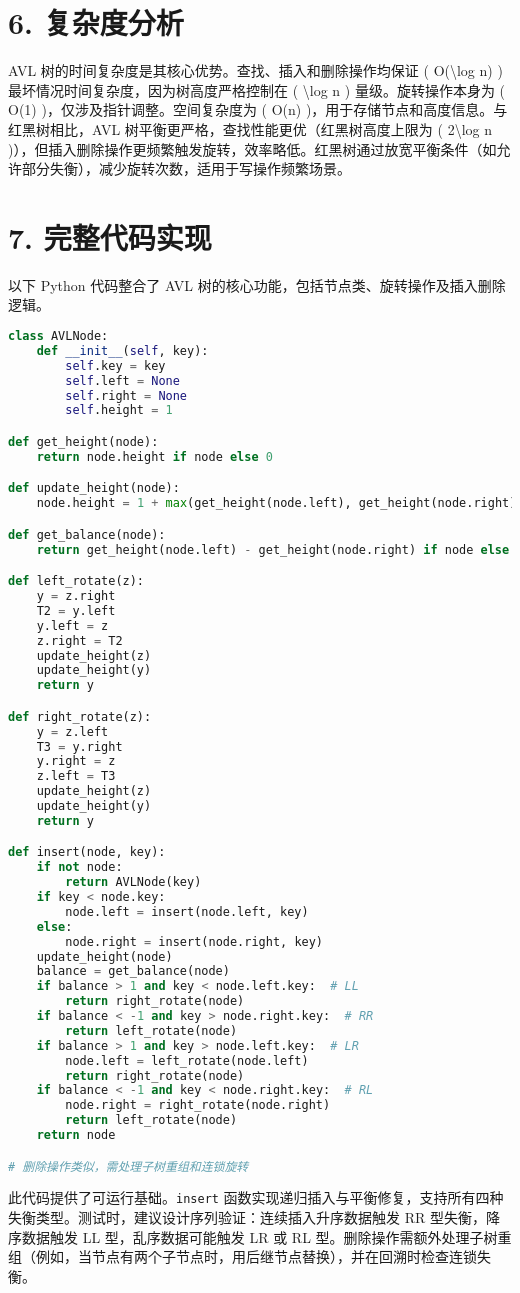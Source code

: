 \chapter{6. 复杂度分析}
AVL 树的时间复杂度是其核心优势。查找、插入和删除操作均保证 ( O(\textbackslash{}log n) ) 最坏情况时间复杂度，因为树高度严格控制在 ( \textbackslash{}log n ) 量级。旋转操作本身为 ( O(1) )，仅涉及指针调整。空间复杂度为 ( O(n) )，用于存储节点和高度信息。与红黑树相比，AVL 树平衡更严格，查找性能更优（红黑树高度上限为 ( 2\textbackslash{}log n )），但插入删除操作更频繁触发旋转，效率略低。红黑树通过放宽平衡条件（如允许部分失衡），减少旋转次数，适用于写操作频繁场景。\par
\chapter{7. 完整代码实现}
以下 Python 代码整合了 AVL 树的核心功能，包括节点类、旋转操作及插入删除逻辑。\par
\begin{lstlisting}[language=python]
class AVLNode:
    def __init__(self, key):
        self.key = key
        self.left = None
        self.right = None
        self.height = 1

def get_height(node):
    return node.height if node else 0

def update_height(node):
    node.height = 1 + max(get_height(node.left), get_height(node.right))

def get_balance(node):
    return get_height(node.left) - get_height(node.right) if node else 0

def left_rotate(z):
    y = z.right
    T2 = y.left
    y.left = z
    z.right = T2
    update_height(z)
    update_height(y)
    return y

def right_rotate(z):
    y = z.left
    T3 = y.right
    y.right = z
    z.left = T3
    update_height(z)
    update_height(y)
    return y

def insert(node, key):
    if not node:
        return AVLNode(key)
    if key < node.key:
        node.left = insert(node.left, key)
    else:
        node.right = insert(node.right, key)
    update_height(node)
    balance = get_balance(node)
    if balance > 1 and key < node.left.key:  # LL
        return right_rotate(node)
    if balance < -1 and key > node.right.key:  # RR
        return left_rotate(node)
    if balance > 1 and key > node.left.key:  # LR
        node.left = left_rotate(node.left)
        return right_rotate(node)
    if balance < -1 and key < node.right.key:  # RL
        node.right = right_rotate(node.right)
        return left_rotate(node)
    return node

# 删除操作类似，需处理子树重组和连锁旋转
\end{lstlisting}
此代码提供了可运行基础。\texttt{insert} 函数实现递归插入与平衡修复，支持所有四种失衡类型。测试时，建议设计序列验证：连续插入升序数据触发 RR 型失衡，降序数据触发 LL 型，乱序数据可能触发 LR 或 RL 型。删除操作需额外处理子树重组（例如，当节点有两个子节点时，用后继节点替换），并在回溯时检查连锁失衡。\par
